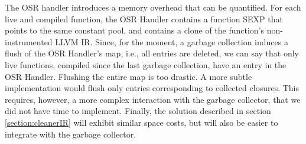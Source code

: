 The OSR handler introduces a memory overhead that can be quantified.
For each live and compiled function, the OSR Handler contains a function SEXP that points to the same constant pool, and contains a clone of the function's non-instrumented LLVM IR.
Since, for the moment, a garbage collection induces a flush of the OSR Handler's  map, i.e., all entries are deleted, we can say that only live functions, compiled since the last garbage collection, have an entry in the OSR Handler.
Flushing the entire map is too drastic. 
A more subtle implementation would flush only entries corresponding to collected closures.
This requires, however, a more complex interaction with the garbage collector, that we did not have time to implement.
Finally, the solution described in section \ref{section:cleanerIR} will exhibit similar space costs, but will also be easier to integrate with the garbage collector.\\
